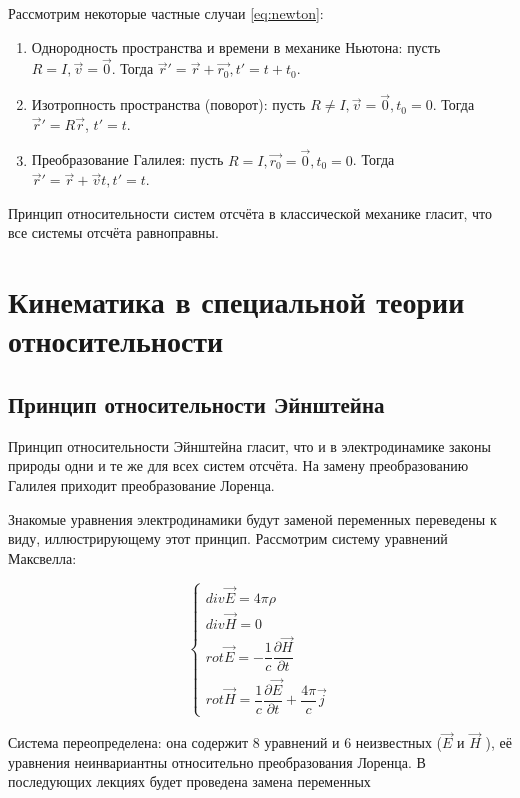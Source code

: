 \documentclass{article}
\begin{document}
Рассмотрим некоторые частные случаи \eqref{eq:newton}:
\begin{enumerate}
    \item Однородность пространства и времени в механике Ньютона: пусть $R=I, \vec{v}=\vec{0}$. Тогда $\vec{r}'=\vec{r}+\vec{r_0}, t'=t+t_0$.
    \item Изотропность пространства (поворот): пусть $R\neq{I}, \vec{v}=\vec{0}, t_0=0$. Тогда $\vec{r}'=R\vec{r}$, $t'=t$.
    \item Преобразование Галилея: пусть $R=I, \vec{r_0}=\vec{0}, t_0=0$. Тогда $\vec{r}'=\vec{r}+\vec{v}t, t'=t$.
\end{enumerate}

Принцип относительности систем отсчёта в классической механике гласит, что все системы отсчёта равноправны.

\section{Кинематика в специальной теории относительности}

\subsection{Принцип относительности Эйнштейна}

Принцип относительности Эйнштейна гласит, что и в электродинамике законы природы одни и те же для всех систем отсчёта. На замену преобразованию Галилея приходит преобразование Лоренца.

Знакомые уравнения электродинамики будут заменой переменных переведены к виду, иллюстрирующему этот принцип. Рассмотрим систему уравнений Максвелла:

\begin{equation}\label{eq:maxwell}
    \begin{cases}
    div\vec{E}=4\pi\rho\\
    div\vec{H}=0\\
    rot\vec{E}=-\dfrac{1}{c}\dfrac{\partial\vec{H}}{\partial t}\\
    rot\vec{H}=\dfrac{1}{c}\dfrac{\partial\vec{E}}{\partial t}+\dfrac{4\pi}{c}\vec{j}
    \end{cases}
\end{equation}

Система переопределена: она содержит 8 уравнений и 6 неизвестных ($\vec{E}$ и $\vec{H}$
), её уравнения неинвариантны относительно преобразования Лоренца. В последующих лекциях будет проведена замена переменных
\end{document}
